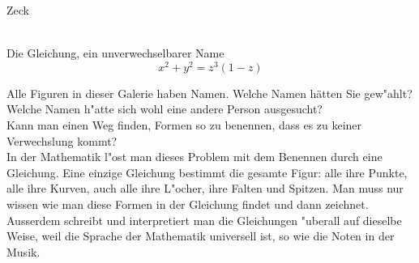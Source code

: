 \documentclass[de]{./../../common/SurferDesc}%
\begin{document}
\footnotesize



\begin{surferPage}
  \begin{surferTitle}Zeck\end{surferTitle}  \\
Die Gleichung, ein unverwechselbarer Name \\
\smallskip
\[x^2 + y^2	= z^3	(1 - z) \]


\singlespacing
Alle Figuren in dieser Galerie haben Namen. Welche Namen h\"atten Sie gew"ahlt? Welche Namen h"atte sich wohl eine andere Person ausgesucht?\\
\vspace{0.3cm}
Kann man einen Weg finden, Formen so zu benennen, dass es zu keiner Verwechslung kommt? \\
In der Mathematik l"ost man dieses Problem mit dem Benennen durch eine Gleichung. Eine einzige Gleichung bestimmt die gesamte Figur: alle ihre Punkte, alle ihre Kurven, auch alle ihre L"ocher, ihre Falten und Spitzen. Man muss nur wissen wie man diese Formen in der Gleichung findet und dann zeichnet.\\

\vspace{0.3cm}
Ausserdem schreibt und interpretiert man die Gleichungen "uberall auf dieselbe Weise, weil die Sprache der Mathematik universell ist, so wie die Noten in der Musik.



  \begin{surferText}
     \end{surferText}
\end{surferPage}
\end{document}
